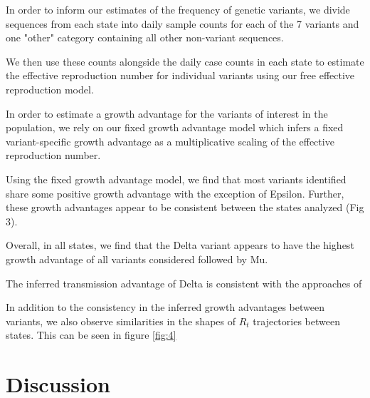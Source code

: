 \documentclass[11pt,oneside,letterpaper]{article}
\begin{document}
In order to inform our estimates of the frequency of genetic variants, we divide sequences from each state into daily sample counts for each of the 7 variants and one "other" category containing all other non-variant sequences.

We then use these counts alongside the daily case counts in each state to estimate the effective reproduction number for individual variants using our free effective reproduction model.


In order to estimate a growth advantage for the variants of interest in the population, we rely on our fixed growth advantage model which infers a fixed variant-specific growth advantage as a multiplicative scaling of the effective reproduction number.

Using the fixed growth advantage model, we find that most variants identified share some positive growth advantage with the exception of Epsilon.
Further, these growth advantages appear to be consistent between the states analyzed (Fig 3).

Overall, in all states, we find that the Delta variant appears to have the highest growth advantage of all variants considered followed by Mu.


The inferred transmission advantage of Delta is consistent with the approaches of %

In addition to the consistency in the inferred growth advantages between variants, we also observe similarities in the shapes of $R_{t}$ trajectories between states. This can be seen in figure \ref{fig:4} %


\section*{Discussion}

\end{document}
